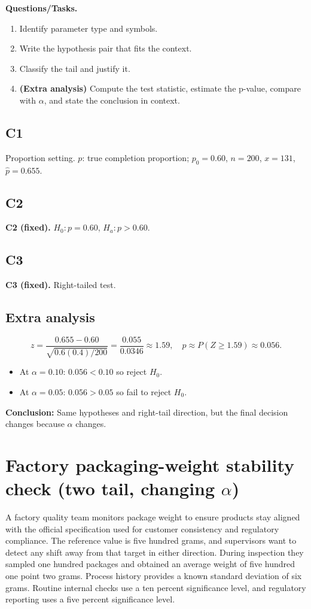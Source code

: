 \textbf{Questions/Tasks.}
\begin{enumerate}
    \item[(C1)] Identify parameter type and symbols.
    \item[(C2)] Write the hypothesis pair that fits the context.
    \item[(C3)] Classify the tail and justify it.
    \item[(EA)] \textbf{(Extra analysis)} Compute the test statistic, estimate the p-value, compare with \(\alpha\), and state the conclusion in context.
\end{enumerate}

\subsection*{C1}
Proportion setting. \(p\): true completion proportion; \(p_0=0.60\), \(n=200\), \(x=131\), \(\hat p=0.655\).

\subsection*{C2}
\textbf{C2 (fixed).} \(H_0:p=0.60\), \(H_a:p>0.60\).

\subsection*{C3}
\textbf{C3 (fixed).} Right-tailed test. \RightTailGraph

\subsection*{Extra analysis}
\[
z=\frac{0.655-0.60}{\sqrt{0.6(0.4)/200}}=\frac{0.055}{0.0346}\approx 1.59,
\quad p\approx P(Z\ge 1.59)\approx 0.056.
\]
\begin{itemize}
\item At \(\alpha=0.10\): \(0.056<0.10\) so reject \(H_0\).
\item At \(\alpha=0.05\): \(0.056>0.05\) so fail to reject \(H_0\).
\end{itemize}

\textbf{Conclusion:} Same hypotheses and right-tail direction, but the final decision changes because \(\alpha\) changes.


\section{Factory packaging-weight stability check (two tail, changing \(\alpha\))}
A factory quality team monitors package weight to ensure products stay aligned with the official specification used for customer consistency and regulatory compliance. The reference value is five hundred grams, and supervisors want to detect any shift away from that target in either direction. During inspection they sampled one hundred packages and obtained an average weight of five hundred one point two grams. Process history provides a known standard deviation of six grams. Routine internal checks use a ten percent significance level, and regulatory reporting uses a five percent significance level.

